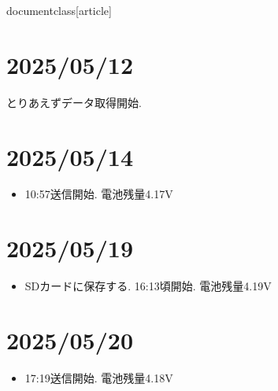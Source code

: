 documentclass[article]



\section{2025/05/12}
とりあえずデータ取得開始.


\section{2025/05/14}
\begin{itemize}
    \item 10:57送信開始. 電池残量4.17V
\end{itemize}

\section{2025/05/19}
\begin{itemize}
    \item SDカードに保存する. 16:13頃開始. 電池残量4.19V
\end{itemize}

\section{2025/05/20}
\begin{itemize}
    \item 17:19送信開始. 電池残量4.18V
\end{itemize}




